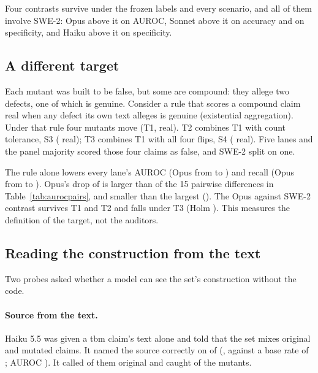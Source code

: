 \documentclass[11pt]{article}
\begin{document}
Four contrasts survive under the frozen labels and every scenario, and all of them involve SWE-2: Opus above it on AUROC, Sonnet above it on accuracy and on specificity, and Haiku above it on specificity.

\subsection{A different target}

Each mutant was built to be false, but some are compound: they allege two defects, one of which is genuine. Consider a rule that scores a compound claim real when any defect its own text alleges is genuine (existential aggregation). Under that rule four mutants move (T1,  real). T2 combines T1 with count tolerance, S3 ( real); T3 combines T1 with all four flips, S4 ( real). Five lanes and the panel majority scored those four claims as false, and SWE-2 split on one.

The rule alone lowers every lane's AUROC (Opus from  to ) and recall (Opus from  to ). Opus's drop of  is larger than  of the 15 pairwise differences in Table~\ref{tab:aurocpairs}, and smaller than the largest (). The Opus against SWE-2 contrast survives T1 and T2 and falls under T3 (Holm ). This measures the definition of the target, not the auditors.

\begin{table}[h]
\centering\small

\caption{AUROC per lane and Holm-adjusted tail $p$ for three pairs under the frozen labels, the four label scenarios (S1 to S4) and the three target-definition scenarios (T1: existential aggregation alone; T2: with count tolerance; T3: with all four flips). Nothing is adjusted across scenarios.}
\label{tab:scenarios}
\end{table}

\subsection{Reading the construction from the text}

Two probes asked whether a model can see the set's construction without the code.

\paragraph{Source from the text.} Haiku 5.5 was given a tbm claim's text alone and told that the set mixes original and mutated claims. It named the source correctly on  of  (, against a base rate of ; AUROC ). It called  of them original and caught  of the  mutants.
\end{document}
